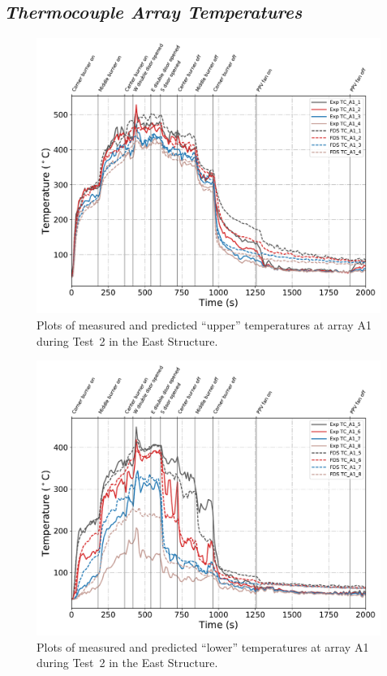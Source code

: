 \clearpage
\subsection*{\textit{Thermocouple Array Temperatures}}
\vspace{4em}
\begin{figure}[!h]
	\centering
	\includegraphics[width=\columnwidth]{Figures/Plots/Validation/Temperature/Test_2_TC_A1_upper}
	\caption{Plots of measured and predicted ``upper'' temperatures at array A1 during Test~2 in the East Structure.}
	\label{fig:TCA1_upper_data_Test2}
\end{figure}
\begin{figure}[p]
	\centering
	\includegraphics[width=\columnwidth]{Figures/Plots/Validation/Temperature/Test_2_TC_A1_lower}
	\caption{Plots of measured and predicted ``lower'' temperatures at array A1 during Test~2 in the East Structure.}
	\label{fig:TCA1_lower_data_Test2}
\end{figure}

